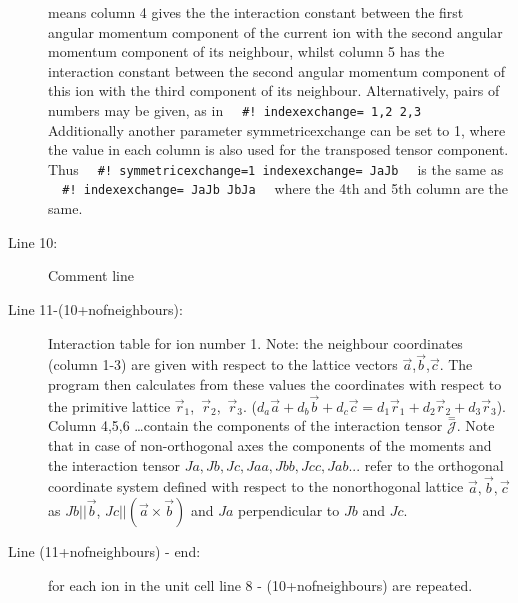 \begin{description}
means column 4 gives the the interaction constant between the
 first angular momentum component of the current ion with the second angular momentum component of its neighbour, whilst 
 column 5 has the interaction constant between the second angular momentum component of this ion with the third component of its
 neighbour. Alternatively, pairs of numbers may be given, as in \verb|  #! indexexchange= 1,2 2,3  |
 Additionally another parameter {\prg symmetricexchange} can be set to 1, where the value in each column is also used 
 for the transposed tensor component. Thus \verb|  #! symmetricexchange=1 indexexchange= JaJb  | is the same as \\
 \verb|  #! indexexchange= JaJb JbJa  | where the 4th and 5th column are the same.
\item [Line 10:]  Comment line
\item [Line 11-(10+nofneighbours):] Interaction table for ion number 1.   
Note: the neighbour coordinates (column 1-3) are given with respect to the lattice vectors
$\vec a$,$\vec b$,$\vec c$. The program then calculates from these values the coordinates
with respect to the primitive lattice $\vec r_1$,~$\vec r_2$,~$\vec r_3$.
($ d_a \vec a + d_b \vec b + d_c \vec c = d_1 \vec r_1 + d_2 \vec r_2 + d_3 \vec r_3$).
Column 4,5,6 \dots contain the components of the interaction tensor $\stackrel{=}{\mathcal J}$. 
Note that in case of non-orthogonal axes the 
components of the moments and the interaction tensor $Ja, Jb, Jc, Jaa, Jbb, Jcc, Jab ...$ 
refer to the orthogonal coordinate system
defined with respect to the nonorthogonal lattice $\vec a,\vec b,\vec c$ as
$Jb||\vec b$, $Jc||(\vec a \times \vec b)$ and $Ja$ perpendicular to $Jb$ and $Jc$.
\item [Line (11+nofneighbours) - end:] for each ion in the unit cell line 8 - (10+nofneighbours)
are repeated.
\end{description}


\vspace{0.5cm}

